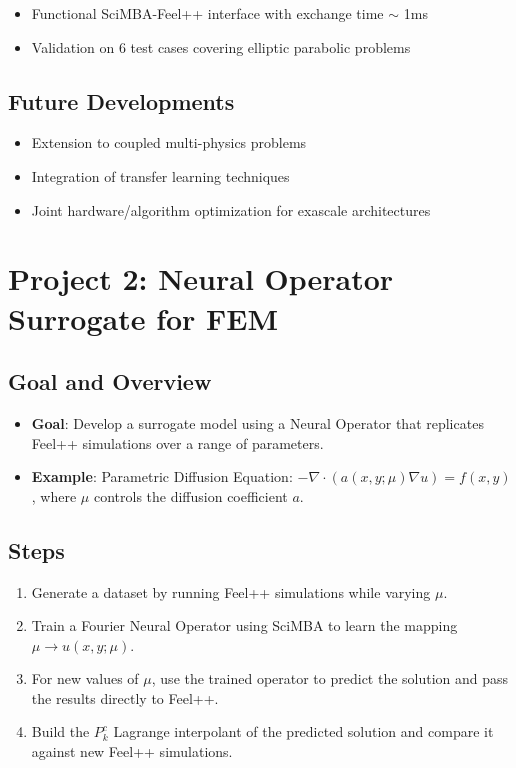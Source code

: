 \documentclass[12pt]{article}
\begin{document}
\begin{itemize}
    \item Functional SciMBA-Feel++ interface with exchange time $\sim$ 1ms 
    \item Validation on 6 test cases covering elliptic parabolic problems 
\end{itemize}

\subsection{Future Developments}

\begin{itemize}
    \item Extension to coupled multi-physics problems 
    \item Integration of transfer learning techniques 
    \item Joint hardware/algorithm optimization for exascale architectures 
\end{itemize}

\section{Project 2: Neural Operator Surrogate for FEM}

\subsection{Goal and Overview}
\begin{itemize}
    \item \textbf{Goal}: Develop a surrogate model using a Neural Operator that replicates Feel++ simulations over a range of parameters.
    \item \textbf{Example}: Parametric Diffusion Equation: $-\nabla \cdot (a(x, y; \mu)\nabla u) = f(x, y)$, where $\mu$ controls the diffusion coefficient $a$.
\end{itemize}

\subsection{Steps}
\begin{enumerate}
    \item Generate a dataset by running Feel++ simulations while varying $\mu$.
    \item Train a Fourier Neural Operator using SciMBA to learn the mapping $\mu \to u(x, y; \mu)$.
    \item For new values of $\mu$, use the trained operator to predict the solution and pass the results directly to Feel++.
    \item Build the $P_{k}^{c}$ Lagrange interpolant of the predicted solution and compare it against new Feel++ simulations.
\end{enumerate}
\end{document}

